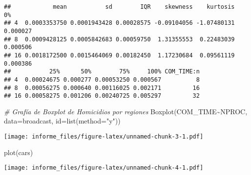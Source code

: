 \documentclass[
]{article}
\newenvironment{Shaded}{\begin{snugshade}}{\end{snugshade}}
\newcommand{\AttributeTok}[1]{\textcolor[rgb]{0.77,0.63,0.00}{#1}}
\newcommand{\CommentTok}[1]{\textcolor[rgb]{0.56,0.35,0.01}{\textit{#1}}}
\newcommand{\ConstantTok}[1]{\textcolor[rgb]{0.00,0.00,0.00}{#1}}
\newcommand{\DecValTok}[1]{\textcolor[rgb]{0.00,0.00,0.81}{#1}}
\newcommand{\FunctionTok}[1]{\textcolor[rgb]{0.00,0.00,0.00}{#1}}
\newcommand{\NormalTok}[1]{#1}
\newcommand{\OtherTok}[1]{\textcolor[rgb]{0.56,0.35,0.01}{#1}}
\newcommand{\SpecialCharTok}[1]{\textcolor[rgb]{0.00,0.00,0.00}{#1}}
\newcommand{\StringTok}[1]{\textcolor[rgb]{0.31,0.60,0.02}{#1}}
\begin{document}
\begin{Shaded}
\end{Shaded}

\begin{verbatim}
##            mean           sd        IQR    skewness    kurtosis       0%
## 4  0.0003353750 0.0001943428 0.00028575 -0.09104056 -1.07480131 0.000027
## 8  0.0009428125 0.0005842683 0.00059750  1.31355553  0.22483039 0.000506
## 16 0.0018172500 0.0015464069 0.00182450  1.17230684  0.09561119 0.000386
##           25%      50%        75%     100% COM_TIME:n
## 4  0.00024675 0.000277 0.00053250 0.000567          8
## 8  0.00056275 0.000640 0.00116025 0.002171         16
## 16 0.00058275 0.001206 0.00240725 0.005297         32
\end{verbatim}

\begin{Shaded}
\begin{Highlighting}[]
\CommentTok{\# Grafía de Boxplot de Homicidios por regiones}
\FunctionTok{Boxplot}\NormalTok{(COM\_TIME}\SpecialCharTok{\textasciitilde{}}\NormalTok{NPROC, }\AttributeTok{data=}\NormalTok{broadcast, }\AttributeTok{id=}\FunctionTok{list}\NormalTok{(}\AttributeTok{method=}\StringTok{"y"}\NormalTok{))}
\end{Highlighting}
\end{Shaded}

\texttt{[image: informe\_files/figure-latex/unnamed-chunk-3-1.pdf]}

\begin{Shaded}
\begin{Highlighting}[]
\FunctionTok{plot}\NormalTok{(cars)}
\end{Highlighting}
\end{Shaded}

\texttt{[image: informe\_files/figure-latex/unnamed-chunk-4-1.pdf]}
\end{document}
